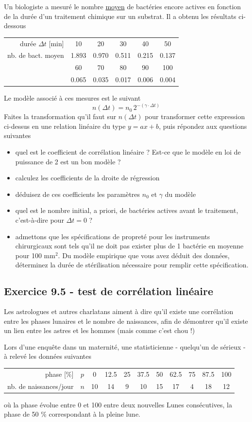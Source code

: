 Un biologiste a mesuré le nombre \underline{moyen} de bactéries encore actives en fonction de la durée d'un traitement chimique sur un substrat. Il a obtenu les résultats ci-dessous
\begin{center}
\begin{tabular}{r|ccccc}
durée $\Delta t$ [min] & 10 & 20 & 30 & 40 & 50 \\
nb. de bact. moyen & 1.893 & 0.970 & 0.511 & 0.215 & 0.137 \\
 & 60 & 70 & 80 & 90 & 100\\
 & 0.065 & 0.035 & 0.017 & 0.006 & 0.004
\end{tabular}
\end{center}
Le modèle associé à ces mesures est le suivant
$$
n(\Delta t)=n_0\,2^{-(\gamma\cdot\Delta t)}
$$
Faites la transformation qu'il faut sur $n(\Delta t)$ pour transformer cette expression ci-dessus en une relation linéaire du type $y=ax+b$, puis répondez aux questions suivantes
\begin{itemize}
\item quel est le coefficient de corrélation linéaire ? Est-ce que le modèle en loi de puissance de 2 est un bon modèle ?
\item calculez les coefficients de la droite de régression
\item déduisez de ces coefficients les paramètres $n_0$ et $\gamma$ du modèle
\item quel est le nombre initial, a priori, de bactéries actives avant le traitement, c'est-à-dire pour $\Delta t=0$ ?
\item admettons que les spécifications de propreté pour les instruments chirurgicaux sont tels qu'il ne doit pas exister plus de 1 bactérie en moyenne pour 100 mm$^2$. Du modèle empirique que vous avez déduit des données, déterminez la durée de stérilisation nécessaire pour remplir cette spécification.
\end{itemize}

\subsection*{Exercice 9.5 - test de corrélation linéaire}

Les astrologues et autres charlatans aiment à dire qu'il existe une corrélation entre les phases lunaires et le nombre de naissances, afin de démontrer qu'il existe un lien entre les astres et les hommes (mais comme c'est chou !)

Lors d'une enquête dans un maternité, une statisticienne - quelqu'un de sérieux - à relevé les données suivantes
\begin{center}
\begin{tabular}{r|c|ccccccccc}
phase [\%] & $p$ & 0 & 12.5 & 25 & 37.5 & 50 & 62.5 & 75 & 87.5 & 100\\
nb. de naissances/jour & $n$ & 10 & 14 & 9 & 10 & 15 & 17 & 4 & 18 & 12
\end{tabular}
\end{center}
où la phase évolue entre 0 et 100 entre deux nouvelles Lunes consécutives, la phase de 50 \% correspondant à la pleine lune.

